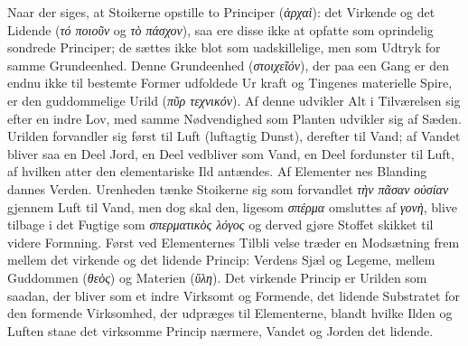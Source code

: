 \documentclass[12pt,a4paper]{book}
\newcommand{\gk}[1]{\textit{#1}}
\begin{document}
Naar der siges, at Stoikerne opstille to Principer (\gk{ἀρχαὶ}):
det Virkende og det Lidende (\gk{τό ποιοῦν} og \gk{τὸ πάσχον}), saa ere
disse ikke at opfatte som oprindelig sondrede Principer; de
sættes ikke blot som uadskillelige, men som Udtryk for samme
Grundeenhed. Denne Grundeenhed (\gk{στοιχεῖόν}), der paa een
Gang er den endnu ikke til bestemte Former udfoldede Ur\-%
kraft og Tingenes materielle Spire, er den guddommelige Urild
(\gk{πῦρ τεχνικόν}). Af denne udvikler Alt i Tilværelsen sig efter
en indre Lov, med samme Nødvendighed som Planten udvikler
sig af Sæden. Urilden forvandler sig først til Luft (luftagtig
Dunst), derefter til Vand; af Vandet bliver saa en Deel Jord,
en Deel vedbliver som Vand, en Deel fordunster til Luft, af
hvilken atter den elementariske Ild antændes. Af Elementer\-%
nes Blanding dannes Verden. Urenheden tænke Stoikerne sig
som forvandlet \gk{τὴν πᾶσαν οὐσίαν} gjennem Luft til Vand, men
dog skal den, ligesom \gk{σπέρμα} omsluttes af \gk{γονὴ}, blive tilbage
i det Fugtige som \gk{σπερματικὸς λόγος} og derved gjøre Stoffet
skikket til videre Formning. Først ved Elementernes Tilbli\-%
velse træder en Modsætning frem mellem det virkende og det
lidende Princip: Verdens Sjæl og Legeme, mellem Guddommen
(\gk{θεὸς}) og Materien (\gk{ὕλη}). Det virkende Princip er Urilden
som saadan, der bliver som et indre Virksomt og Formende,
det lidende Substratet for den formende Virksomhed, der
udpræges til Elementerne, blandt hvilke Ilden og Luften staae
det virksomme Princip nærmere, Vandet og Jorden det lidende.
\end{document}
